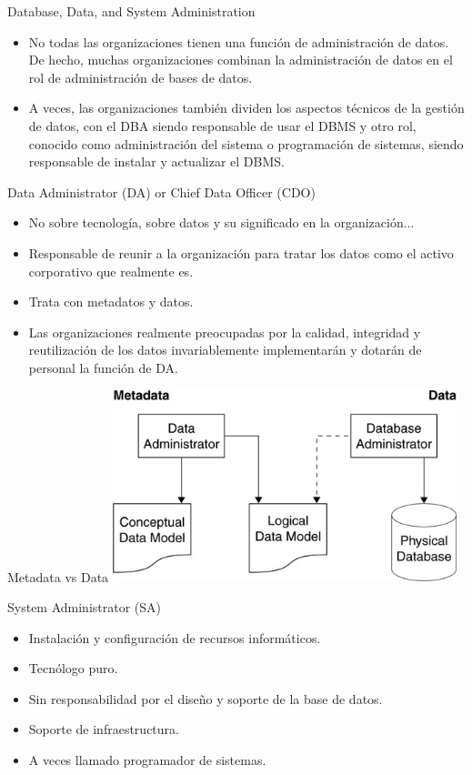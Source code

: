 \documentclass{beamer}
\begin{document}
\begin{frame}{Database, Data, and System Administration}
    \begin{itemize}
        \item No todas las organizaciones tienen una función de administración de datos. De hecho, muchas organizaciones combinan la administración de datos en el rol de administración de bases de datos. 
        \item A veces, las organizaciones también dividen los aspectos técnicos de la gestión de datos, con el DBA siendo responsable de usar el DBMS y otro rol, conocido como administración del sistema o programación de sistemas, siendo responsable de instalar y actualizar el DBMS.
    \end{itemize}
\end{frame}

\begin{frame}{Data Administrator (DA) or Chief Data Officer (CDO)}
    \begin{itemize}
        \item No sobre tecnología, sobre datos y su significado en la organización...
        \item Responsable de reunir a la organización para tratar los datos como el activo corporativo que realmente es.
        \item Trata con metadatos y datos.
        \item Las organizaciones realmente preocupadas por la calidad, integridad y reutilización de los datos invariablemente implementarán y dotarán de personal la función de DA.
    \end{itemize}
\end{frame}

\begin{frame}{Metadata vs Data}
    \centering
    \includegraphics[width=0.75\textwidth]{figures/metadata2.png}
\end{frame}

\begin{frame}{System Administrator (SA)}
    \begin{itemize}
        \item Instalación y configuración de recursos informáticos.
        \item Tecnólogo puro.
        \item Sin responsabilidad por el diseño y soporte de la base de datos.
        \item Soporte de infraestructura.
        \item A veces llamado programador de sistemas.
    \end{itemize}
\end{frame}
\end{document}
